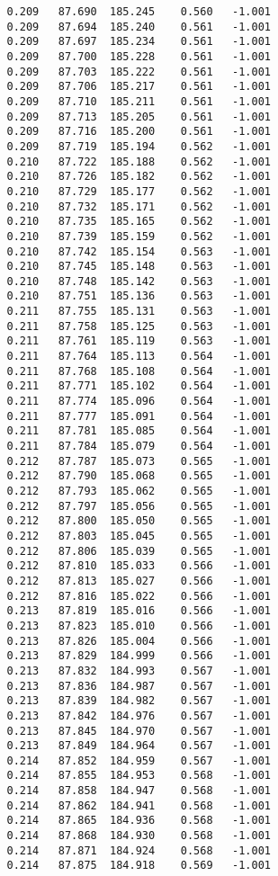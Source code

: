 \begin{verbatim}
   0.209   87.690  185.245    0.560   -1.001
   0.209   87.694  185.240    0.561   -1.001
   0.209   87.697  185.234    0.561   -1.001
   0.209   87.700  185.228    0.561   -1.001
   0.209   87.703  185.222    0.561   -1.001
   0.209   87.706  185.217    0.561   -1.001
   0.209   87.710  185.211    0.561   -1.001
   0.209   87.713  185.205    0.561   -1.001
   0.209   87.716  185.200    0.561   -1.001
   0.209   87.719  185.194    0.562   -1.001
   0.210   87.722  185.188    0.562   -1.001
   0.210   87.726  185.182    0.562   -1.001
   0.210   87.729  185.177    0.562   -1.001
   0.210   87.732  185.171    0.562   -1.001
   0.210   87.735  185.165    0.562   -1.001
   0.210   87.739  185.159    0.562   -1.001
   0.210   87.742  185.154    0.563   -1.001
   0.210   87.745  185.148    0.563   -1.001
   0.210   87.748  185.142    0.563   -1.001
   0.210   87.751  185.136    0.563   -1.001
   0.211   87.755  185.131    0.563   -1.001
   0.211   87.758  185.125    0.563   -1.001
   0.211   87.761  185.119    0.563   -1.001
   0.211   87.764  185.113    0.564   -1.001
   0.211   87.768  185.108    0.564   -1.001
   0.211   87.771  185.102    0.564   -1.001
   0.211   87.774  185.096    0.564   -1.001
   0.211   87.777  185.091    0.564   -1.001
   0.211   87.781  185.085    0.564   -1.001
   0.211   87.784  185.079    0.564   -1.001
   0.212   87.787  185.073    0.565   -1.001
   0.212   87.790  185.068    0.565   -1.001
   0.212   87.793  185.062    0.565   -1.001
   0.212   87.797  185.056    0.565   -1.001
   0.212   87.800  185.050    0.565   -1.001
   0.212   87.803  185.045    0.565   -1.001
   0.212   87.806  185.039    0.565   -1.001
   0.212   87.810  185.033    0.566   -1.001
   0.212   87.813  185.027    0.566   -1.001
   0.212   87.816  185.022    0.566   -1.001
   0.213   87.819  185.016    0.566   -1.001
   0.213   87.823  185.010    0.566   -1.001
   0.213   87.826  185.004    0.566   -1.001
   0.213   87.829  184.999    0.566   -1.001
   0.213   87.832  184.993    0.567   -1.001
   0.213   87.836  184.987    0.567   -1.001
   0.213   87.839  184.982    0.567   -1.001
   0.213   87.842  184.976    0.567   -1.001
   0.213   87.845  184.970    0.567   -1.001
   0.213   87.849  184.964    0.567   -1.001
   0.214   87.852  184.959    0.567   -1.001
   0.214   87.855  184.953    0.568   -1.001
   0.214   87.858  184.947    0.568   -1.001
   0.214   87.862  184.941    0.568   -1.001
   0.214   87.865  184.936    0.568   -1.001
   0.214   87.868  184.930    0.568   -1.001
   0.214   87.871  184.924    0.568   -1.001
   0.214   87.875  184.918    0.569   -1.001

\end{verbatim}

